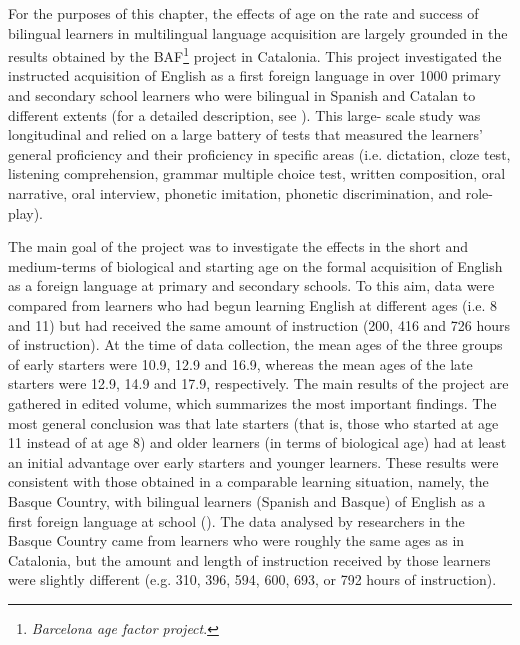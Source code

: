 \documentclass[output=paper]{../langscibook}
\begin{document}
For the purposes of this chapter, the effects of age on the rate and success of bilingual learners in multilingual language acquisition are largely grounded in the results obtained by the BAF\footnote{\textit{Barcelona age factor project}.} project in Catalonia. This project investigated the instructed acquisition of English as a first foreign language in over 1000 primary and secondary school learners who were bilingual in Spanish and Catalan to different extents (for a detailed description, see \citealt{Muñoz2000}). This large- scale study was longitudinal and relied on a large battery of tests that measured the learners’ general proficiency and their proficiency in specific areas (i.e. dictation, cloze test, listening comprehension, grammar multiple choice test, written composition, oral narrative, oral interview, phonetic imitation, phonetic discrimination, and role-play).

The main goal of the project was to investigate the effects in the short and medium-terms of biological and starting age on the formal acquisition of English as a foreign language at primary and secondary schools. To this aim, data were compared from learners who had begun learning English at different ages (i.e. 8 and 11) but had received the same amount of instruction (200, 416 and 726 hours of instruction). At the time of data collection, the mean ages of the three groups of early starters were 10.9, 12.9 and 16.9, whereas the mean ages of the late starters were 12.9, 14.9 and 17.9, respectively. The main results of the project are gathered in  edited volume, which summarizes the most important findings. The most general conclusion was that late starters (that is, those who started at age 11 instead of at age 8) and older learners (in terms of biological age) had at least an initial advantage over early starters and younger learners. These results were consistent with those obtained in a comparable learning situation, namely, the Basque Country, with bilingual learners (Spanish and Basque) of English as a first foreign language at school (\citealt{García-MayoGarcía-Lecumberri2003}). The data analysed by researchers in the Basque Country came from learners who were roughly the same ages as in Catalonia, but the amount and length of instruction received by those learners were slightly different (e.g. 310, 396, 594, 600, 693, or 792 hours of instruction).
\end{document}

